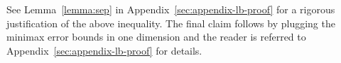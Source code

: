 See Lemma~\ref{lemma:sep} in Appendix~\ref{sec:appendix-lb-proof} for a rigorous justification of the above inequality.
The final claim follows by plugging the minimax error bounds in one dimension and the reader is referred to Appendix~\ref{sec:appendix-lb-proof} for details.
\fi



%



